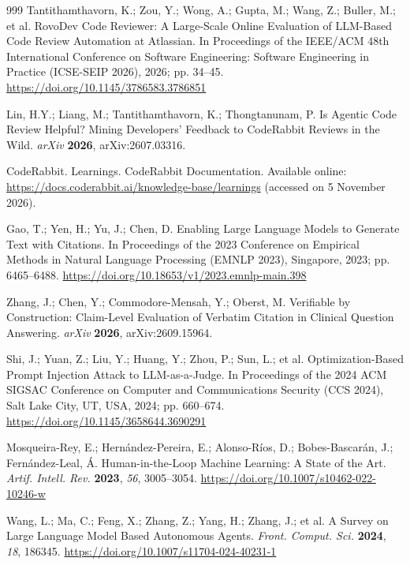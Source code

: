\documentclass[computers,article,submit,moreauthors]{Definitions/mdpi}
\begin{document}
{\begin{thebibliography}{999}
Tantithamthavorn, K.; Zou, Y.; Wong, A.; Gupta, M.; Wang, Z.; Buller, M.; et al. RovoDev Code Reviewer: A Large-Scale Online Evaluation of LLM-Based Code Review Automation at Atlassian. In Proceedings of the IEEE/ACM 48th International Conference on Software Engineering: Software Engineering in Practice (ICSE-SEIP 2026), 2026; pp. 34--45. \url{https://doi.org/10.1145/3786583.3786851}

Lin, H.Y.; Liang, M.; Tantithamthavorn, K.; Thongtanunam, P. Is Agentic Code Review Helpful? Mining Developers' Feedback to CodeRabbit Reviews in the Wild. \emph{arXiv} {\bf 2026}, arXiv:2607.03316.

CodeRabbit. Learnings. CodeRabbit Documentation. Available online: \url{https://docs.coderabbit.ai/knowledge-base/learnings} (accessed on 5 November 2026).

Gao, T.; Yen, H.; Yu, J.; Chen, D. Enabling Large Language Models to Generate Text with Citations. In Proceedings of the 2023 Conference on Empirical Methods in Natural Language Processing (EMNLP 2023), Singapore, 2023; pp. 6465--6488. \url{https://doi.org/10.18653/v1/2023.emnlp-main.398}

Zhang, J.; Chen, Y.; Commodore-Mensah, Y.; Oberst, M. Verifiable by Construction: Claim-Level Evaluation of Verbatim Citation in Clinical Question Answering. \emph{arXiv} {\bf 2026}, arXiv:2609.15964.

Shi, J.; Yuan, Z.; Liu, Y.; Huang, Y.; Zhou, P.; Sun, L.; et al. Optimization-Based Prompt Injection Attack to LLM-as-a-Judge. In Proceedings of the 2024 ACM SIGSAC Conference on Computer and Communications Security (CCS 2024), Salt Lake City, UT, USA, 2024; pp. 660--674. \url{https://doi.org/10.1145/3658644.3690291}

Mosqueira-Rey, E.; Hern\'andez-Pereira, E.; Alonso-R\'ios, D.; Bobes-Bascar\'an, J.; Fern\'andez-Leal, \'A. Human-in-the-Loop Machine Learning: A State of the Art. {\em Artif. Intell. Rev.} {\bf 2023}, {\em 56}, 3005--3054. \url{https://doi.org/10.1007/s10462-022-10246-w}

Wang, L.; Ma, C.; Feng, X.; Zhang, Z.; Yang, H.; Zhang, J.; et al. A Survey on Large Language Model Based Autonomous Agents. {\em Front. Comput. Sci.} {\bf 2024}, {\em 18}, 186345. \url{https://doi.org/10.1007/s11704-024-40231-1}


\end{thebibliography}}
\end{document}

